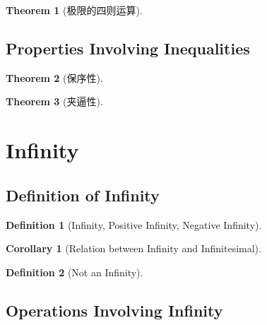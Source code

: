 \documentclass[onecolumn]{ctexart}
\newtheorem{definition}{Definition}
\newtheorem{theorem}{Theorem}
\newtheorem{corollary}{Corollary}
\begin{document}
\begin{theorem}[极限的四则运算]
  
\end{theorem}

\subsection{Properties Involving Inequalities}

\begin{theorem}[保序性]
  
\end{theorem}

\begin{theorem}[夹逼性]
  
\end{theorem}

\section{Infinity}

\subsection{Definition of Infinity}

\begin{definition}[Infinity, Positive Infinity, Negative Infinity]
  
\end{definition}

\begin{corollary}[Relation between Infinity and Infinitesimal]
  
\end{corollary}

\begin{definition}[Not an Infinity]
  
\end{definition}

\subsection{Operations Involving Infinity}
\end{document}
